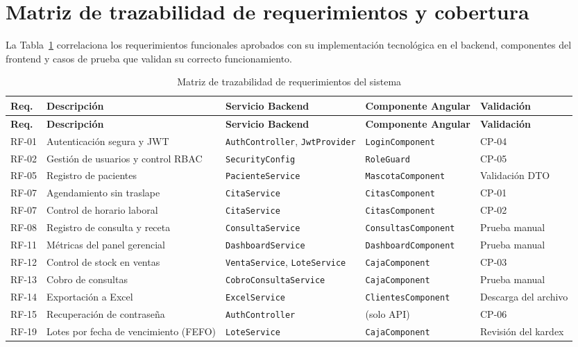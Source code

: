\documentclass[11pt,a4paper]{report}
\begin{document}
\section{Matriz de trazabilidad de requerimientos y cobertura}
La Tabla~\ref{tab:trazabilidad} correlaciona los requerimientos funcionales aprobados con su implementación tecnológica en el backend, componentes del frontend y casos de prueba que validan su correcto funcionamiento.

\begin{longtable}{@{}p{1.2cm} p{3.4cm} p{3.2cm} p{4.4cm} p{2.0cm}@{}}
\caption{Matriz de trazabilidad de requerimientos del sistema}\label{tab:trazabilidad}\\
\toprule
\textbf{Req.} & \textbf{Descripción} & \textbf{Servicio Backend} & \textbf{Componente Angular} & \textbf{Validación} \\
\midrule
\endfirsthead
\toprule
\textbf{Req.} & \textbf{Descripción} & \textbf{Servicio Backend} & \textbf{Componente Angular} & \textbf{Validación} \\
\midrule
\endhead
\bottomrule
\endfoot
RF-01 & Autenticación segura y JWT & \texttt{AuthController}, \texttt{JwtProvider} & \texttt{LoginComponent} & CP-04 \\
RF-02 & Gestión de usuarios y control RBAC & \texttt{SecurityConfig} & \texttt{RoleGuard} & CP-05 \\
RF-05 & Registro de pacientes & \texttt{PacienteService} & \texttt{MascotaComponent} & Validación DTO \\
RF-07 & Agendamiento sin traslape & \texttt{CitaService} & \texttt{CitasComponent} & CP-01 \\
RF-07 & Control de horario laboral & \texttt{CitaService} & \texttt{CitasComponent} & CP-02 \\
RF-08 & Registro de consulta y receta & \texttt{ConsultaService} & \texttt{ConsultasComponent} & Prueba manual \\
RF-11 & Métricas del panel gerencial & \texttt{DashboardService} & \texttt{DashboardComponent} & Prueba manual \\
RF-12 & Control de stock en ventas & \texttt{VentaService}, \texttt{LoteService} & \texttt{CajaComponent} & CP-03 \\
RF-13 & Cobro de consultas & \texttt{CobroConsulta\allowbreak Service} & \texttt{CajaComponent} & Prueba manual \\
RF-14 & Exportación a Excel & \texttt{ExcelService} & \texttt{ClientesComponent} & Descarga del archivo \\
RF-15 & Recuperación de contraseña & \texttt{AuthController} & (solo API) & CP-06 \\
RF-19 & Lotes por fecha de vencimiento (FEFO) & \texttt{LoteService} & \texttt{CajaComponent} & Revisión del kardex \\
\end{longtable}
\end{document}
